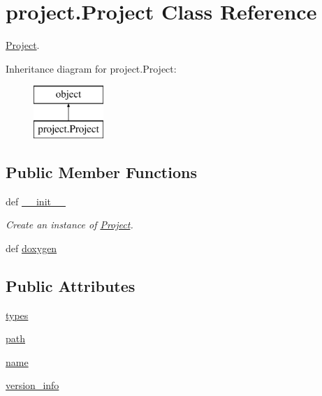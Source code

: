 \hypertarget{classproject_1_1Project}{\section{project.\-Project Class Reference}
\label{classproject_1_1Project}
}


\hyperlink{classproject_1_1Project}{Project}.  


Inheritance diagram for project.\-Project\-:\begin{figure}[H]
\begin{center}
\leavevmode
\includegraphics[height=2.000000cm]{df/df4/classproject_1_1Project}
\end{center}
\end{figure}
\subsection*{Public Member Functions}
\begin{DoxyCompactItemize}
\item 
def \hyperlink{classproject_1_1Project_ad564f2b23ef66feabb0b5499fcb06848}{\-\_\-\-\_\-init\-\_\-\-\_\-}
\begin{DoxyCompactList}\small\item\em Create an instance of \hyperlink{classproject_1_1Project}{Project}. \end{DoxyCompactList}\item 
def \hyperlink{classproject_1_1Project_a2ec34e4c6b2538f33b0f48d7a617fffc}{doxygen}
\end{DoxyCompactItemize}
\subsection*{Public Attributes}
\begin{DoxyCompactItemize}
\item 
\hyperlink{classproject_1_1Project_a2e8103f243f75d9fd8a1aad1e4d42438}{types}
\item 
\hyperlink{classproject_1_1Project_a4f614c3151a85166a2fdd2cc28f2500e}{path}
\item 
\hyperlink{classproject_1_1Project_a575c22bbfaf434da1d68f33ffa90572a}{name}
\item 
\hyperlink{classproject_1_1Project_ad7b1bfdfc4fbbd0f18c46c27e6f3c72a}{version\-\_\-info}
\end{DoxyCompactItemize}
